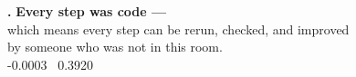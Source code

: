 \documentclass[aspectratio=169,11pt]{beamer}
\begin{document}
{%
\begin{frame}[plain]
  \centering
  \vfill
  {\ttfamily\bfseries\color{Amber}\Large .\hspace{0.45em}}%
  {\color{white}\LARGE\bfseries Every step was code ---}\\[0.9em]
  {\color{PaperSoft}\Large which means every step can be rerun, checked,
   and improved}\\[0.35em]
  {\color{PaperSoft}\Large by someone who was not in this room.}\\[2.4em]
  {\ttfamily\color{Amber}-0.0003 \textrightarrow\ 0.3920}
  \vfill
\end{frame}}
\end{document}
